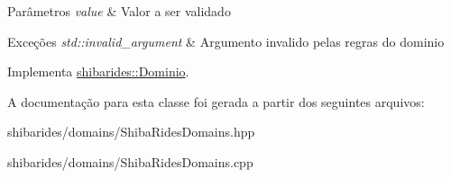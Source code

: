 \begin{DoxyParams}{Parâmetros}
{\em value} & Valor a ser validado \\
\hline
\end{DoxyParams}

\begin{DoxyExceptions}{Exceções}
{\em std\+::invalid\+\_\+argument} & Argumento invalido pelas regras do dominio \\
\hline
\end{DoxyExceptions}


Implementa \hyperlink{classshibarides_1_1Dominio_acc9445531455c072bbf708709aebbe55}{shibarides\+::\+Dominio}.



A documentação para esta classe foi gerada a partir dos seguintes arquivos\+:\begin{DoxyCompactItemize}
\item 
shibarides/domains/Shiba\+Rides\+Domains.\+hpp\item 
shibarides/domains/Shiba\+Rides\+Domains.\+cpp\end{DoxyCompactItemize}
